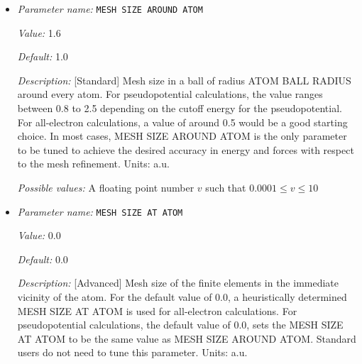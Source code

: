 \begin{itemize}
{\it Value:} false


{\it Default:} false


{\it Description:} [Developer] Generates adaptive mesh based on a-posteriori mesh adaption strategy using single atom wavefunctions before computing the ground-state. Default: false.


{\it Possible values:} A boolean value (true or false)
\item {\it Parameter name:} {\tt MESH SIZE AROUND ATOM}
\label{parameters:Finite element mesh parameters/Auto mesh generation parameters/MESH SIZE AROUND ATOM}
\label{parameters:Finite_20element_20mesh_20parameters/Auto_20mesh_20generation_20parameters/MESH_20SIZE_20AROUND_20ATOM}


{\it Value:} 1.6


{\it Default:} 1.0


{\it Description:} [Standard] Mesh size in a ball of radius ATOM BALL RADIUS around every atom. For pseudopotential calculations, the value ranges between 0.8 to 2.5 depending on the cutoff energy for the pseudopotential. For all-electron calculations, a value of around 0.5 would be a good starting choice. In most cases, MESH SIZE AROUND ATOM is the only parameter to be tuned to achieve the desired accuracy in energy and forces with respect to the mesh refinement. Units: a.u.


{\it Possible values:} A floating point number $v$ such that $0.0001 \leq v \leq 10$
\item {\it Parameter name:} {\tt MESH SIZE AT ATOM}
\label{parameters:Finite element mesh parameters/Auto mesh generation parameters/MESH SIZE AT ATOM}
\label{parameters:Finite_20element_20mesh_20parameters/Auto_20mesh_20generation_20parameters/MESH_20SIZE_20AT_20ATOM}


{\it Value:} 0.0


{\it Default:} 0.0


{\it Description:} [Advanced] Mesh size of the finite elements in the immediate vicinity of the atom. For the default value of 0.0, a heuristically determined MESH SIZE AT ATOM is used for all-electron calculations. For pseudopotential calculations, the default value of 0.0, sets the MESH SIZE AT ATOM to be the same value as MESH SIZE AROUND ATOM. Standard users do not need to tune this parameter. Units: a.u.



\end{itemize}
